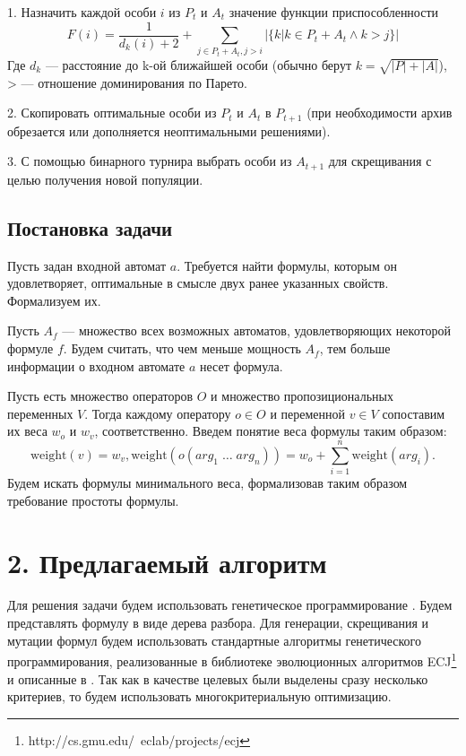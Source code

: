 \documentclass[12pt,fleqn]{article}
\begin{document}
1. Назначить каждой особи $i$ из $P_t$ и $A_t$ значение функции приспособленности
$$
F(i) = \frac{1}{d_k(i) + 2} + \sum_{j\in P_t + A_t, j > i}|\{k|k \in P_t + A_t \wedge k > j\}|
$$
Где $d_k$ --- расстояние до k-ой ближайшей особи (обычно берут $k = \sqrt{|P| + |A|}$), > --- отношение доминирования по Парето.

2. Скопировать оптимальные особи из $P_t$ и $A_t$ в $P_{t+1}$ (при необходимости архив обрезается или дополняется неоптимальными решениями).

3. С помощью бинарного турнира выбрать особи из $A_{t+1}$ для скрещивания с целью получения новой популяции.

\subsection{Постановка задачи}

Пусть задан входной автомат $a$. Требуется найти формулы, которым он удовлетворяет, оптимальные в смысле двух ранее указанных свойств. Формализуем их.

Пусть $A_f$ --- множество всех возможных автоматов, удовлетворяющих некоторой формуле $f$. Будем считать,
что чем меньше мощность $A_f$, тем больше информации о входном автомате $a$ несет формула.

Пусть есть множество операторов $O$ и множество пропозициональных переменных $V$.
Тогда каждому оператору $o \in O$ и переменной $v \in V$ сопоставим их веса $w_o$ и $w_v$, соответственно.
Введем понятие веса формулы таким образом:
\begin{equation*}
\text{weight}(v) = w_v, \text{weight}(o(arg_1\; \ldots \; arg_n)) = w_o + \sum_{i=1}^{n}\text{weight}(arg_i).
\end{equation*}
Будем искать формулы минимального веса, формализовав таким образом требование простоты формулы.

\section{2. Предлагаемый алгоритм}

Для решения задачи будем использовать генетическое программирование \cite{kz1}. Будем представлять формулу в виде дерева разбора.
Для генерации, скрещивания и мутации формул будем использовать стандартные алгоритмы генетического программирования,
реализованные в библиотеке эволюционных алгоритмов ECJ\footnote{http://cs.gmu.edu/~eclab/projects/ecj} и описанные в \cite{kz1, kz2}.
Так как в качестве целевых были выделены сразу несколько критериев, то будем использовать многокритериальную оптимизацию.
\end{document}
